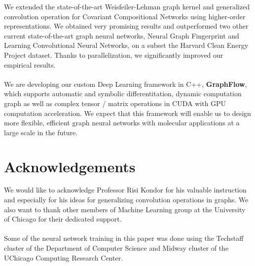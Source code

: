 \documentclass[a4paper]{article}
\begin{document}
We extended the state-of-the-art Weisfeiler-Lehman graph kernel and generalized convolution operation for Covariant Compositional Networks using higher-order representations. We obtained very promising results and outperformed two other current state-of-the-art graph neural networks, Neural Graph Fingerprint and Learning Convolutional Neural Networks, on a subset the Harvard Clean Energy Project dataset. Thanks to parallelization, we significantly improved our empirical results. \\ \\
We are developing our custom Deep Learning framework in C++, \textbf{GraphFlow}, which supports automatic and symbolic differentitation, dynamic computation graph as well as complex tensor / matrix operations in CUDA with GPU computation acceleration. We expect that this framework will enable us to design more flexible, efficient graph neural networks with molecular applications at a large scale in the future.

\section{Acknowledgements}

We would like to acknowledge Professor Risi Kondor for his valuable instruction and especially for his ideas for generalizing convolution operations in graphs. We also want to thank other members of Machine Learning group at the University of Chicago for their dedicated support. \\ \\
Some of the neural network training in this paper was done using the Techstaff cluster of the Department of Computer Science and Midway cluster of the UChicago Computing Research Center.




\end{document}

